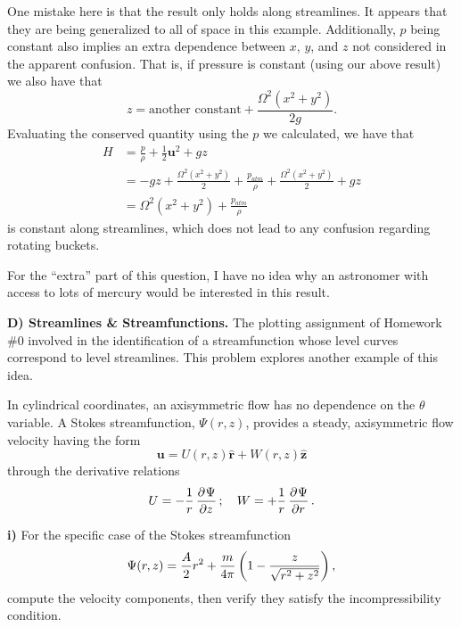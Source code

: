 \documentclass{article}
\def\*#1{\mathbf{#1}}
\newcommand{\rhat}{\mathbf{\hat{r}}}
\newcommand{\zhat}{\mathbf{\hat{z}}}
\begin{document}
One mistake here is that the result only holds along streamlines. It
appears that they are being generalized to all of space in this example.
Additionally, $p$ being constant also implies an extra dependence
between $x$, $y$, and $z$ not considered in the apparent confusion. That
is, if pressure is constant (using our above result) we also have that
%
\begin{equation*}
    z = \text{another constant} + \frac{\Omega^2 (x^2 + y^2)}{2 g}
    .
\end{equation*}
%
Evaluating the conserved quantity using the $p$ we calculated, we have
that
%
\begin{align*}
    H &= \frac{p}{\rho} + \frac{1}{2} \*u^2 + g z \\
      &= - g z + \frac{\Omega^2 (x^2 + y^2)}{2} + \frac{p_{atm}}{\rho}
        + \frac{\Omega^2 (x^2 + y^2)}{2} + g z \\
      &= \Omega^2 (x^2 + y^2) + \frac{p_{atm}}{\rho}
\end{align*}
%
is constant along streamlines, which does not lead to any confusion
regarding rotating buckets.

For the ``extra'' part of this question, I have no idea why an
astronomer with access to lots of mercury would be interested in this
result.

\newpage

\textbf{D) Streamlines \& Streamfunctions.}
The plotting assignment of Homework \#0 involved in the identification
of a streamfunction whose level curves correspond to level streamlines.
This problem explores another example of this idea.

In cylindrical coordinates, an axisymmetric flow has no dependence on
the $\theta$ variable. A Stokes streamfunction, $\Psi(r, z)$, provides a
steady, axisymmetric flow velocity having the form
%
\begin{equation*}
    \*u = U(r, z) \rhat + W(r, z) \zhat
\end{equation*}
%
through the derivative relations
%
\begin{equation*}
    U = - \frac{1}{r} \dpd{\Psi}{z}; \quad W = + \frac{1}{r} \dpd{\Psi}{r}
    .
\end{equation*}

\textbf{i)} For the specific case of the Stokes streamfunction
%
\begin{equation*}
    \Psi(r, z) = \frac{A}{2} r^2 + \frac{m}{4 \pi} \del{1 - \frac{z}{\sqrt{r^2 + z^2}}}
    ,
\end{equation*}
%
compute the velocity components, then verify they satisfy the
incompressibility condition.
\end{document}
